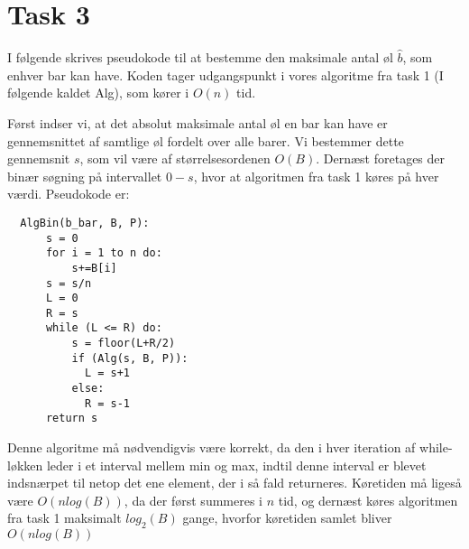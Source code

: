 \section{Task 3}
I følgende skrives pseudokode til at bestemme den maksimale antal øl $\hat{b}$, som enhver bar kan have. Koden tager udgangspunkt i vores algoritme fra task 1 (I følgende kaldet Alg), som kører i $O(n)$ tid.

Først indser vi, at det absolut maksimale antal øl en bar kan have er gennemsnittet af samtlige øl fordelt over alle barer. Vi bestemmer dette gennemsnit $s$, som vil være af størrelsesordenen $O(B)$.
Dernæst foretages der binær søgning på intervallet $0-s$, hvor at algoritmen fra task 1 køres på hver værdi. Pseudokode er:\\

\begin{lstlisting}
  AlgBin(b_bar, B, P):
      s = 0
      for i = 1 to n do:
          s+=B[i]
      s = s/n
      L = 0
      R = s
      while (L <= R) do:
          s = floor(L+R/2)
          if (Alg(s, B, P)):
            L = s+1
          else:
            R = s-1
      return s
\end{lstlisting}

Denne algoritme må nødvendigvis være korrekt, da den i hver iteration af while-løkken leder i et interval mellem min og max, indtil 
denne interval er blevet indsnærpet til netop det ene element, der i så fald returneres. 
Køretiden må ligeså være $O(nlog(B))$, da der først summeres i $n$ tid, og dernæst køres algoritmen fra task 1 maksimalt $log_2(B)$ gange, 
hvorfor køretiden samlet bliver $O(nlog(B))$


